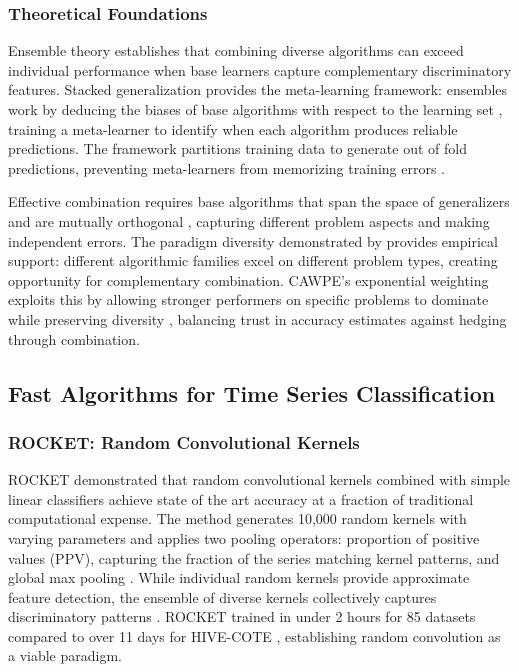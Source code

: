 \documentclass[pdflatex,sn-basic]{sn-jnl}           %
\theoremstyle{thmstyleone}%
\theoremstyle{thmstyletwo}%
\theoremstyle{thmstylethree}%
\begin{document}
\subsubsection{Theoretical Foundations}

Ensemble theory establishes that combining diverse algorithms can exceed individual performance when base learners capture complementary discriminatory features. Stacked generalization \citep{stacked-generalization} provides the meta-learning framework: ensembles work by deducing the biases of base algorithms with respect to the learning set \citep[p.~241]{stacked-generalization}, training a meta-learner to identify when each algorithm produces reliable predictions. The framework partitions training data to generate out of fold predictions, preventing meta-learners from memorizing training errors \citep[p.~244]{stacked-generalization}.

Effective combination requires base algorithms that span the space of generalizers and are mutually orthogonal \citep[p.~256]{stacked-generalization}, capturing different problem aspects and making independent errors. The paradigm diversity demonstrated by \citet[Table~11, p.~648]{tsc-bakeoff} provides empirical support: different algorithmic families excel on different problem types, creating opportunity for complementary combination. CAWPE's exponential weighting exploits this by allowing stronger performers on specific problems to dominate while preserving diversity \citep[p.~1675]{cawpe}, balancing trust in accuracy estimates against hedging through combination.

\subsection{Fast Algorithms for Time Series Classification}

\subsubsection{ROCKET: Random Convolutional Kernels}

ROCKET \citep{rocket} demonstrated that random convolutional kernels combined with simple linear classifiers achieve state of the art accuracy at a fraction of traditional computational expense. The method generates 10,000 random kernels with varying parameters and applies two pooling operators: proportion of positive values (PPV), capturing the fraction of the series matching kernel patterns, and global max pooling \citep[Section~3, pp.~1462--1463]{rocket}. While individual random kernels provide approximate feature detection, the ensemble of diverse kernels collectively captures discriminatory patterns \citep[p.~1455]{rocket}. ROCKET trained in under 2 hours for 85 datasets compared to over 11 days for HIVE-COTE \citep[p.~1455]{rocket}, establishing random convolution as a viable paradigm.
\end{document}
